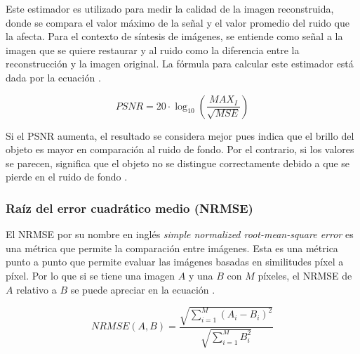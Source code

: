 Este estimador es utilizado para medir la calidad de la imagen reconstruida, donde se compara el valor máximo de la señal y el valor promedio del ruido que la afecta. Para el contexto de síntesis de imágenes, se entiende como señal a la imagen que se quiere restaurar y al ruido como la diferencia entre la reconstrucción y la imagen original. La fórmula para calcular este estimador está dada por la ecuación  \citep{LiberonaTesis}.

\begin{equation}
\label{eq:psnr}
    PSNR = 20 \cdot \log_{10}(\frac{MAX_{I}}{\sqrt{MSE}})
\end{equation}

Si el PSNR aumenta, el resultado se considera mejor pues indica que el brillo del objeto es mayor en comparación al ruido de fondo. Por el contrario, si los valores se parecen, significa que el objeto no se distingue correctamente debido a que se pierde en el ruido de fondo \citep{CeledonTesis}. 


\subsubsection{Raíz del error cuadrático medio (NRMSE)}
\label{sec:nrmse}

El NRMSE por su nombre en inglés \textit{simple normalized root-mean-square error} es una métrica que permite la comparación entre imágenes. Esta es una métrica punto a punto que permite evaluar las imágenes basadas en similitudes píxel a píxel. Por lo que si se tiene una imagen $A$ y una $B$ con $M$ píxeles, el NRMSE de $A$ relativo a $B$ se puede apreciar en la ecuación  \citep{Chael_2018}.

\begin{equation}
    \label{eq:nrmse}
    NRMSE(A,B) = \frac{\sqrt{\sum_{i=1}^{M}(A_i - B_i)^2}}{\sqrt{\sum_{i=1}^M B_{i}^2}}
\end{equation}


